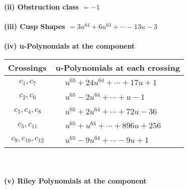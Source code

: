 \documentclass[1p]{elsarticle_modified}
\theoremstyle{definition}
\begin{document}
\flushleft \textbf{(ii) Obstruction class $= -1$}\\~\\
\flushleft \textbf{(iii) Cusp Shapes $= 3 u^{64}+6 u^{63}+\cdots-13 u-3$}\\~\\
\newpage\renewcommand{\arraystretch}{1}
\flushleft \textbf{(iv) u-Polynomials at the component}\newline \\
\begin{tabular}{m{50pt}|m{274pt}}
Crossings & \hspace{64pt}u-Polynomials at each crossing \\
\hline $$\begin{aligned}c_{1},c_{7}\end{aligned}$$&$\begin{aligned}
&u^{65}+24 u^{64}+\cdots+17 u+1
\end{aligned}$\\
\hline $$\begin{aligned}c_{2},c_{6}\end{aligned}$$&$\begin{aligned}
&u^{65}-2 u^{64}+\cdots+u-1
\end{aligned}$\\
\hline $$\begin{aligned}c_{3},c_{4},c_{8}\end{aligned}$$&$\begin{aligned}
&u^{65}+2 u^{64}+\cdots+72 u-36
\end{aligned}$\\
\hline $$\begin{aligned}c_{5},c_{11}\end{aligned}$$&$\begin{aligned}
&u^{65}+u^{64}+\cdots+896 u+256
\end{aligned}$\\
\hline $$\begin{aligned}c_{9},c_{10},c_{12}\end{aligned}$$&$\begin{aligned}
&u^{65}-9 u^{64}+\cdots-9 u+1
\end{aligned}$\\
\hline
\end{tabular}\\~\\
\newpage\renewcommand{\arraystretch}{1}
\flushleft \textbf{(v) Riley Polynomials at the component}\newline \\
\end{document}
